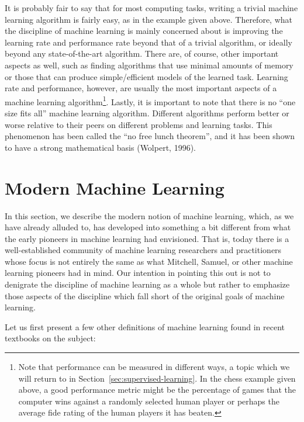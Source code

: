 It is probably fair to say that for most computing tasks, writing a trivial machine learning algorithm is fairly easy, as in the example given above. Therefore, what the discipline of machine learning is mainly concerned about is improving the learning rate and performance rate beyond that of a trivial algorithm, or ideally beyond any state-of-the-art algorithm. There are, of course, other important aspects as well, such as finding algorithms that use minimal amounts of memory or those that can produce simple/efficient models of the learned task. Learning rate and performance, however, are usually the most important aspects of a machine learning algorithm\footnote{Note that performance can be measured in different ways, a topic which we will return to in Section~\ref{sec:supervised-learning}. %
In the chess example given above, a good performance metric might be the percentage of games that the computer wins against a randomly selected human player or perhaps the average \gls{fide} rating of the human players it has beaten.}. Lastly, it is important to note that there is no ``one size fits all'' machine learning algorithm. Different algorithms perform better or worse relative to their peers on different problems and learning tasks. This phenomenon has been called the ``no free lunch theorem'', and it has been shown to have a strong mathematical basis (Wolpert, 1996).

\section{Modern Machine Learning}
\label{sec:modern-machine-learning}

In this section, we describe the modern notion of machine learning, which, as we have already alluded to, has developed into something a bit different from what the early pioneers in machine learning had envisioned. That is, today there is a well-established community of machine learning researchers and practitioners whose focus is not entirely the same as what Mitchell, Samuel, or other machine learning pioneers had in mind. Our intention in pointing this out is not to denigrate the discipline of machine learning as a whole but rather to emphasize those aspects of the discipline which fall short of the original goals of machine learning. 

Let us first present a few other definitions of machine learning found in recent textbooks on the subject:

